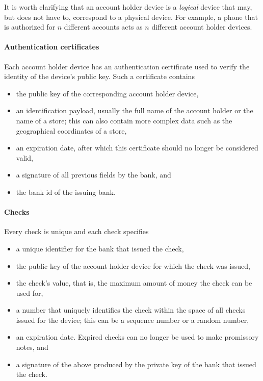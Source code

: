 \documentclass[12pt,a4paper]{article}
\begin{document}
\begin{multicols}{2}
	It is worth clarifying that an account holder device is a \emph{logical} device that may, but does not have to, correspond to a physical device. For example, a phone that is authorized for $n$ different accounts acts as $n$ different account holder devices.

	\paragraph{Authentication certificates}
	
	Each account holder device has an authentication certificate used to verify the identity of the device's public key. Such a certificate contains
	\begin{itemize}
		\item the public key of the corresponding account holder device,
		\item an identification payload, usually the full name of the account holder or the name of a store; this can also contain more complex data such as the geographical coordinates of a store,
		\item an expiration date, after which this certificate should no longer be considered valid,
		\item a signature of all previous fields by the bank, and
		\item the bank id of the issuing bank.
	\end{itemize}

	\paragraph{Checks}
	
	Every check is unique and each check specifies
	
	\begin{itemize}
		\item a unique identifier for the bank that issued the check,
		\item the public key of the account holder device for which the check was issued,
		\item the check's value, that is, the maximum amount of money the check can be used for,
		\item a number that uniquely identifies the check within the space of all checks issued for the device; this can be a sequence number or a random number,
		\item an expiration date. Expired checks can no longer be used to make promissory notes, and
		\item a signature of the above produced by the private key of the bank that issued the check.
	\end{itemize}


\end{multicols}
\end{document}
